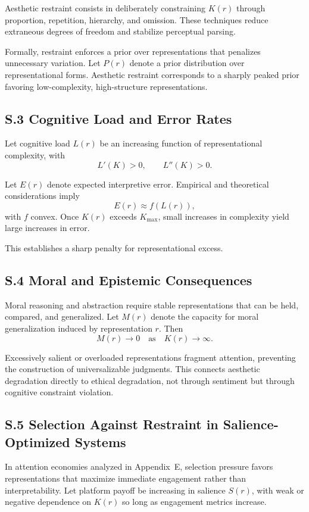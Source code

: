 \documentclass[11pt]{article}
\begin{document}
Aesthetic restraint consists in deliberately constraining \(K(r)\) through proportion, repetition, hierarchy, and omission. These techniques reduce extraneous degrees of freedom and stabilize perceptual parsing.

Formally, restraint enforces a prior over representations that penalizes unnecessary variation. Let \(P(r)\) denote a prior distribution over representational forms. Aesthetic restraint corresponds to a sharply peaked prior favoring low-complexity, high-structure representations.

\subsection{S.3 Cognitive Load and Error Rates}

Let cognitive load \(L(r)\) be an increasing function of representational complexity, with
\[
L'(K) > 0, \qquad L''(K) > 0.
\]

Let \(E(r)\) denote expected interpretive error. Empirical and theoretical considerations imply
\[
E(r) \approx f(L(r)),
\]
with \(f\) convex. Once \(K(r)\) exceeds \(K_{\max}\), small increases in complexity yield large increases in error.

This establishes a sharp penalty for representational excess.

\subsection{S.4 Moral and Epistemic Consequences}

Moral reasoning and abstraction require stable representations that can be held, compared, and generalized. Let \(M(r)\) denote the capacity for moral generalization induced by representation \(r\). Then
\[
M(r) \to 0 \quad \text{as} \quad K(r) \to \infty.
\]

Excessively salient or overloaded representations fragment attention, preventing the construction of universalizable judgments. This connects aesthetic degradation directly to ethical degradation, not through sentiment but through cognitive constraint violation.

\subsection{S.5 Selection Against Restraint in Salience-Optimized Systems}

In attention economies analyzed in Appendix~E, selection pressure favors representations that maximize immediate engagement rather than interpretability. Let platform payoff be increasing in salience \(S(r)\), with weak or negative dependence on \(K(r)\) so long as engagement metrics increase.
\end{document}
